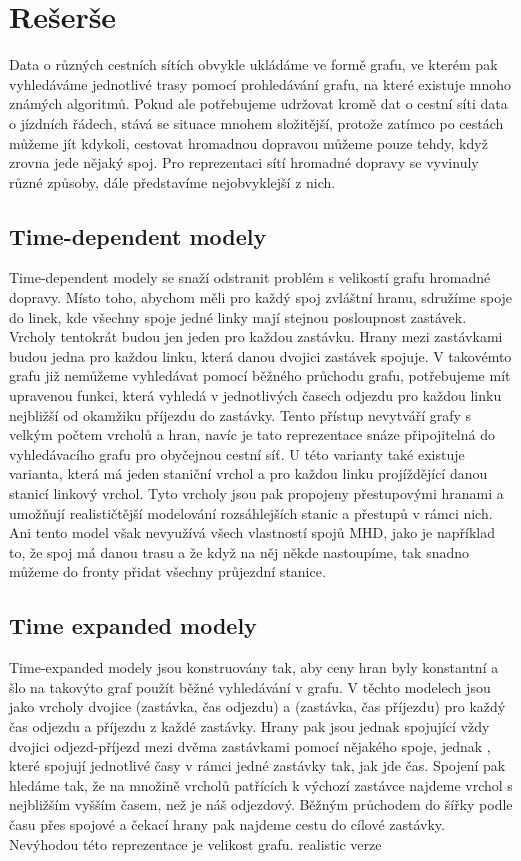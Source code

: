 \chapter{Rešerše}
Data o různých cestních sítích obvykle ukládáme ve formě grafu, ve kterém pak
vyhledáváme jednotlivé trasy pomocí prohledávání grafu, na které existuje mnoho
známých algoritmů. Pokud ale potřebujeme udržovat kromě dat o cestní síti data o
jízdních řádech, stává se situace mnohem složitější, protože zatímco po cestách
můžeme jít kdykoli, cestovat hromadnou dopravou můžeme pouze tehdy, když zrovna
jede nějaký spoj. Pro reprezentaci sítí hromadné dopravy se vyvinuly různé
způsoby, dále představíme nejobvyklejší z nich.

\section{Time-dependent modely}
Time-dependent modely \cite{time-dependent} se snaží odstranit problém s
velikostí grafu hromadné dopravy. Místo toho, abychom měli pro každý spoj
zvláštní hranu, sdružíme spoje do linek, kde všechny spoje jedné linky mají
stejnou posloupnost zastávek. Vrcholy tentokrát budou jen jeden pro každou
zastávku. Hrany mezi zastávkami budou jedna pro každou linku, která danou
dvojici zastávek spojuje. V takovémto grafu již nemůžeme vyhledávat pomocí
běžného průchodu grafu, potřebujeme mít upravenou funkci, která vyhledá v
jednotlivých časech odjezdu pro každou linku nejbližší od okamžiku příjezdu do
zastávky. Tento přístup nevytváří grafy s velkým počtem vrcholů a hran, navíc je
tato reprezentace snáze připojitelná do vyhledávacího grafu pro obyčejnou cestní
síť. U této varianty také existuje varianta, která má jeden staniční vrchol a
pro každou linku projíždějící danou stanicí linkový vrchol. Tyto vrcholy jsou
pak propojeny přestupovými hranami a umožňují realističtější modelování
rozsáhlejších stanic a přestupů v rámci nich. Ani tento model však nevyužívá
všech vlastností spojů MHD, jako je například to, že spoj má danou trasu a že
když na něj někde nastoupíme, tak snadno můžeme do fronty přidat všechny
průjezdní stanice.  

\section{Time expanded modely}
Time-expanded modely \cite{time-expanded} jsou konstruovány tak, aby ceny hran
byly konstantní a šlo na takovýto graf použít běžné vyhledávání v grafu. V
těchto modelech jsou jako vrcholy dvojice (zastávka, čas odjezdu) a (zastávka,
čas příjezdu) pro každý čas odjezdu a příjezdu z každé zastávky. Hrany pak
jsou jednak  spojující vždy dvojici odjezd-příjezd mezi dvěma
zastávkami pomocí nějakého spoje, jednak , které spojují jednotlivé
časy v rámci jedné zastávky tak, jak jde čas. Spojení pak hledáme tak, že na
množině vrcholů patřících k výchozí zastávce najdeme vrchol s nejbližším vyšším
časem, než je náš odjezdový. Běžným průchodem do šířky podle času přes spojové a
čekací hrany pak najdeme cestu do cílové zastávky. Nevýhodou této reprezentace
je velikost grafu. \TODO realistic verze

